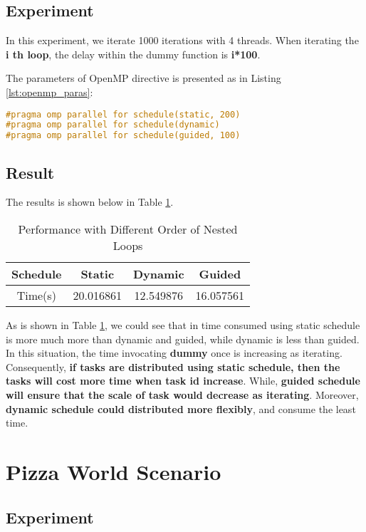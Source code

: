 \documentclass[a4paper]{article}   %
\begin{document}
\begin{CJK}{UTF8}{gbsn}
\begin{spacing}{1.2}
\subsection{Experiment}
In this experiment, we iterate 1000 iterations with 4 threads. When iterating the \textbf{i th loop}, the delay within the dummy function is \textbf{i*100}. 

The parameters of OpenMP directive is presented as in Listing \ref{lst:openmp_paras}:
\begin{lstlisting}[language=C, label=lst:openmp_paras, caption=The parameter for Different Schedule]
#pragma omp parallel for schedule(static, 200)
#pragma omp parallel for schedule(dynamic)
#pragma omp parallel for schedule(guided, 100)
\end{lstlisting}

\subsection{Result}
The results is shown below in Table \ref{table:openmp_paras}.

\begin{table}[htbp]
\centering
\begin{tabular}{|c|c|c|c|}
\hline Schedule & Static & Dynamic & Guided \\ 
\hline Time(s) & 20.016861 & 12.549876 & 16.057561 \\ 
\hline 
\end{tabular} 
\caption{Performance with Different Order of Nested Loops} \label{table:openmp_paras}
\end{table}

As is shown in Table \ref{table:openmp_paras}, we could see that in time consumed using static schedule is more much more than dynamic and guided, while dynamic is less than guided. In this situation, the time  invocating \textbf{dummy} once is increasing as iterating. Consequently, \textbf{if tasks are distributed using static schedule, then the tasks will cost more time when task id increase}. While, \textbf{guided schedule will ensure that the scale of task would decrease as iterating}. Moreover, \textbf{dynamic schedule could distributed more flexibly}, and consume the least time. 

\section{Pizza World Scenario}
\subsection{Experiment}

\end{spacing}
\end{CJK}
\end{document}
